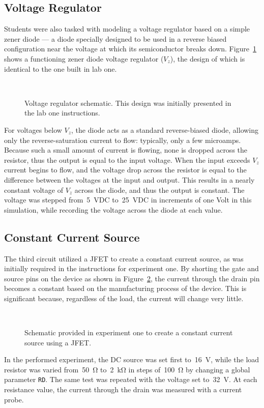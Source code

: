 \subsection{Voltage Regulator}
Students were also tasked with modeling a voltage regulator based on a simple
zener diode --- a diode specially designed to be used in a reverse biased
configuration near the voltage at which its semiconductor breaks down.
Figure~\ref{fig:schem3} shows a functioning zener diode voltage regulator
($V_z$), the design of which is identical to the one built in lab one.
%
\begin{figure}[H]
	\centering
	\\
	\parbox{3.5in}{
	\caption[Schematic --- Voltage Regulator]{Voltage regulator schematic.
		This design was initially presented in the lab one instructions.}
	\label{fig:schem3}}
\end{figure}
%
For voltages below $V_z$, the diode acts as a standard reverse-biased diode,
allowing only the reverse-saturation current to flow: typically, only a few
microamps.  Because such a small amount of current is flowing, none is dropped
across the resistor, thus the output is equal to the input voltage.  When the
input exceeds $V_z$ current begins to flow, and the voltage drop across the
resistor is equal to the difference between the voltages at the input and
output.  This results in a nearly constant voltage of $V_z$ across the diode,
and thus the output is constant.  The voltage was stepped from~\SI{5}{\volt}DC
to~\SI{25}{\volt}{DC} in increments of one Volt in this simulation, while
recording the voltage across the diode at each value.

\subsection{Constant Current Source}
The third circuit utilized a JFET to create a constant current source, as was
initially required in the instructions for experiment one.  By shorting the
gate and source pins on the device as shown in Figure~\ref{fig:schem4}, the
current through the drain pin becomes a constant based on the manufacturing
process of the device.  This is significant because, regardless of the load,
the current will change very little.
%
\begin{figure}[H]
	\centering
	\\
	\parbox{3.5in}{
	\caption[Schematic --- Constant Current Source]{Schematic provided in
		experiment one to create a constant current source using a JFET.}
	\label{fig:schem4}}
\end{figure}
%
In the performed experiment, the DC source was set first to~\SI{16}{\volt},
while the load resistor was varied from~\SI{50}{\ohm} to~\SI{2}{\kilo\ohm} in
steps of~\SI{100}{\ohm} by changing a global parameter \texttt{RD}.  The same
test was repeated with the voltage set to~\SI{32}{\volt}.  At each resistance
value, the current through the drain was measured with a current probe.

